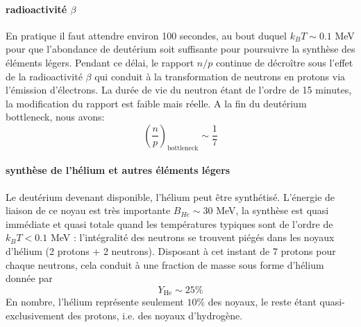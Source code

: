 \paragraph{radioactivité $\beta$} En pratique il faut attendre environ 100 secondes, au bout duquel $k_B T\sim 0.1$ MeV pour que l'abondance de deutérium soit suffisante pour poursuivre la synthèse des éléments légers. Pendant ce délai, le rapport $n/p$ continue de décroître sous l'effet de la radioactivité $\beta$  qui conduit à la transformation de neutrons en protons via l'émission d'électrons. La durée de vie du neutron étant de l'ordre de 15 minutes, la modification du rapport est faible mais réelle. A la fin du deutérium bottleneck, nous avons:
\begin{equation}
\left(\frac{n}{p}\right)_\mathrm{bottleneck} \sim \frac{1}{7}
\end{equation}

\paragraph{synthèse de l'hélium et autres éléments légers}
Le deutérium devenant disponible, l'hélium peut être synthétisé. L'énergie de liaison de ce noyau est très importante $B_{He}\sim 30$ MeV, la synthèse est quasi immédiate et quasi totale quand les températures typiques sont de l'ordre de $k_B T < 0.1$ MeV : l'intégralité des neutrons se trouvent piégés dans les noyaux d'hélium (2 protons + 2 neutrons). Disposant à cet instant de 7 protons pour chaque neutrons, cela conduit à une fraction de masse sous forme d'hélium donnée par
\begin{equation}
Y_\mathrm{He}\sim 25\%
\end{equation}
En nombre, l'hélium représente seulement $10\%$ des noyaux, le reste étant quasi-exclusivement des protons, i.e. des noyaux d'hydrogène.

